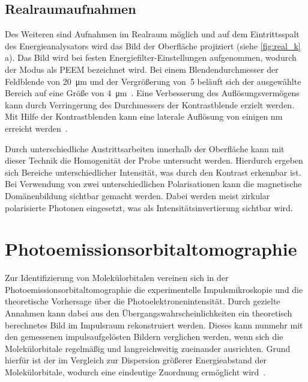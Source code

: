         \subsection{Realraumaufnahmen}
            Des Weiteren sind Aufnahmen im Realraum möglich und auf dem Eintrittsspalt des Energieanalysators wird das Bild der Oberfläche projiziert (siehe \autoref{fig:real_k}\,a).
            Das Bild wird bei festen Energiefilter-Einstellungen aufgenommen, wodurch der Modus als PEEM bezeichnet wird.
            Bei einem Blendendurchmesser der Feldblende von \SI{20}{\micro\meter} und der Vergrößerung von~\num{5} beläuft sich der ausgewählte Bereich auf eine Größe von \SI{4}{\micro\meter}~\cite{SPECS-MM}.
            Eine Verbesserung des Auflösungsvermögens kann durch Verringerung des Durchmessers der Kontrastblende erzielt werden.
            Mit Hilfe der Kontrastblenden kann eine laterale Auflösung von einigen \si{\nano\meter} erreicht werden~\cite{locatelli_chemical_2015}. 

            Durch unterschiedliche Austrittsarbeiten innerhalb der Oberfläche kann mit dieser Technik die Homogenität der Probe untersucht werden.
            Hierdurch ergeben sich Bereiche unterschiedlicher Intensität, was durch den Kontrast erkennbar ist.
            Bei Verwendung von zwei unterschiedlichen Polarisationen kann die magnetische Domänenbildung sichtbar gemacht werden.
            Dabei werden meist zirkular polarisierte Photonen eingesetzt, was als Intensitätsinvertierung sichtbar wird.
        
    \section{Photoemissionsorbitaltomographie} \label{sec:MOT}
        Zur Identifizierung von Molekülorbitalen vereinen sich in der Photoemissionsorbitaltomographie die experimentelle Impulsmikroskopie und die theoretische Vorhersage über die Photoelektronenintensität.
        Durch gezielte Annahmen kann dabei aus den Übergangswahrscheinlichkeiten ein theoretisch berechnetes Bild im Impulsraum rekonstruiert werden.
        Dieses kann nunmehr mit den gemessenen impulsaufgelösten Bildern verglichen werden, wenn sich die Molekülorbitale regelmäßig und langreichweitig zueinander ausrichten.
        Grund hierfür ist der im Vergleich zur Dispersion größerer Energieabstand der Molekülorbitale, wodurch eine eindeutige Zuordnung ermöglicht wird~\cite{puschnig_reconstruction_2009}.

